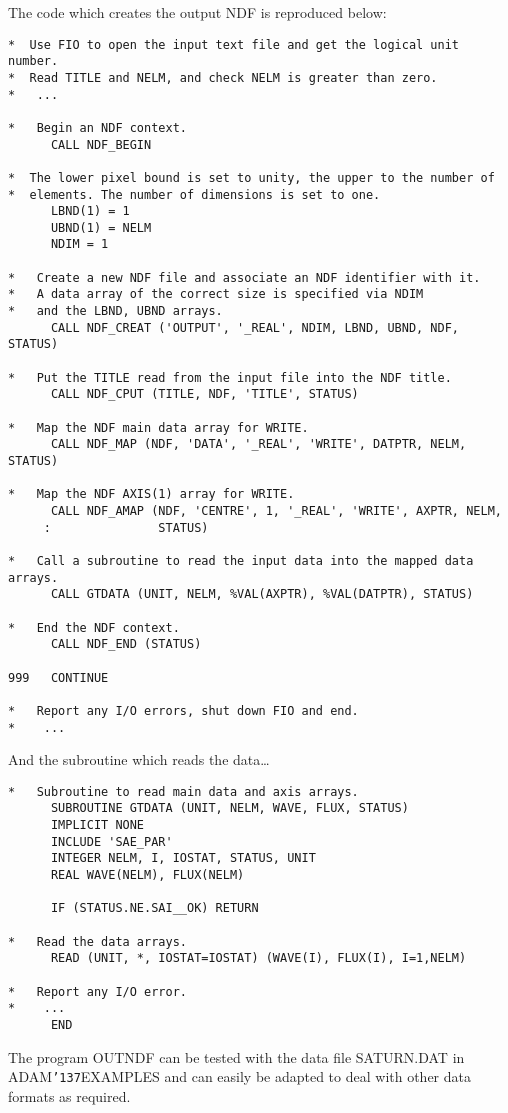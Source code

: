 \documentclass[twoside,11pt]{article}
\renewcommand{\_}{{\tt\char'137}}
\begin{document}
The code which creates the output NDF is reproduced below:
\begin{verbatim}
*  Use FIO to open the input text file and get the logical unit number.
*  Read TITLE and NELM, and check NELM is greater than zero.
*   ...

*   Begin an NDF context.    
      CALL NDF_BEGIN                                          

*  The lower pixel bound is set to unity, the upper to the number of
*  elements. The number of dimensions is set to one.
      LBND(1) = 1
      UBND(1) = NELM
      NDIM = 1
                                                              
*   Create a new NDF file and associate an NDF identifier with it.
*   A data array of the correct size is specified via NDIM
*   and the LBND, UBND arrays.
      CALL NDF_CREAT ('OUTPUT', '_REAL', NDIM, LBND, UBND, NDF, STATUS)

*   Put the TITLE read from the input file into the NDF title.
      CALL NDF_CPUT (TITLE, NDF, 'TITLE', STATUS)

*   Map the NDF main data array for WRITE.
      CALL NDF_MAP (NDF, 'DATA', '_REAL', 'WRITE', DATPTR, NELM, STATUS)

*   Map the NDF AXIS(1) array for WRITE.
      CALL NDF_AMAP (NDF, 'CENTRE', 1, '_REAL', 'WRITE', AXPTR, NELM, 
     :               STATUS)

*   Call a subroutine to read the input data into the mapped data arrays.
      CALL GTDATA (UNIT, NELM, %VAL(AXPTR), %VAL(DATPTR), STATUS)

*   End the NDF context.                                       
      CALL NDF_END (STATUS)                                  

999   CONTINUE

*   Report any I/O errors, shut down FIO and end.
*    ...      
\end{verbatim}
And the subroutine which reads the data\ldots
\begin{verbatim}
*   Subroutine to read main data and axis arrays.
      SUBROUTINE GTDATA (UNIT, NELM, WAVE, FLUX, STATUS)
      IMPLICIT NONE                               
      INCLUDE 'SAE_PAR' 
      INTEGER NELM, I, IOSTAT, STATUS, UNIT
      REAL WAVE(NELM), FLUX(NELM)
      
      IF (STATUS.NE.SAI__OK) RETURN

*   Read the data arrays.
      READ (UNIT, *, IOSTAT=IOSTAT) (WAVE(I), FLUX(I), I=1,NELM)

*   Report any I/O error.
*    ...
      END
\end{verbatim}
The program OUTNDF can be tested with the data file SATURN.DAT in 
ADAM\_EXAMPLES and can easily be adapted to deal with other data formats
as required.
\end{document}
